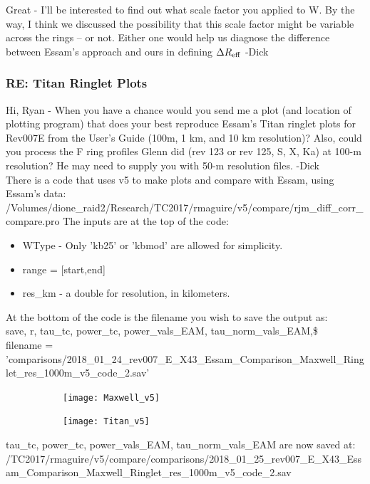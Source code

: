 \documentclass[crop=false,class=article,oneside]{standalone}
\begin{document}
Great - I'll be interested to find out what scale factor you applied to W. By the way, I think we discussed the possibility that this scale factor might be variable across the rings -- or not. Either one would help us diagnose the difference between Essam's approach and ours in defining $\Delta R_{\rm eff}$ -Dick
\subsubsection{\footnotesize RE: Titan Ringlet Plots}
Hi, Ryan - When you have a chance would you send me a plot (and location of plotting program) that does your best reproduce Essam's Titan ringlet plots for Rev007E from the User's Guide (100m, 1 km, and 10 km resolution)? 
Also, could you process the F ring profiles Glenn did (rev 123 or rev 125, S, X, Ka) at 100-m resolution? He may need to supply you with 50-m resolution files. -Dick\\
There is a code that uses v5 to make plots and compare with Essam, using Essam's data:\\
/Volumes/dione\_raid2/Research/TC2017/rmaguire/v5/compare/rjm\_diff\_corr\_compare.pro
The inputs are at the top of the code:
\begin{itemize}
    \item WType - Only 'kb25' or 'kbmod' are allowed for simplicity.
    \item range = [start,end]
    \item res\_km - a double for resolution, in kilometers.
\end{itemize}
At the bottom of the code is the filename you wish to save the output as:\\
save, r, tau\_tc, power\_tc, power\_vals\_EAM, tau\_norm\_vals\_EAM,\$\\
filename = 'comparisons/2018\_01\_24\_rev007\_E\_X43\_Essam\_Comparison\_Maxwell\_Ringlet\_res\_1000m\_v5\_code\_2.sav'
\begin{figure}[H]
    \centering
    \begin{subfigure}[b]{0.49\textwidth}
        \texttt{[image: Maxwell\_v5]}
    \end{subfigure}
    \begin{subfigure}[b]{0.49\textwidth}
        \texttt{[image: Titan\_v5]}
    \end{subfigure}
\end{figure}
tau\_tc, power\_tc, power\_vals\_EAM, tau\_norm\_vals\_EAM are now saved at:\\
/TC2017/rmaguire/v5/compare/comparisons/2018\_01\_25\_rev007\_E\_X43\_Essam\_Comparison\_Maxwell\_Ringlet\_res\_1000m\_v5\_code\_2.sav\\
\end{document}

